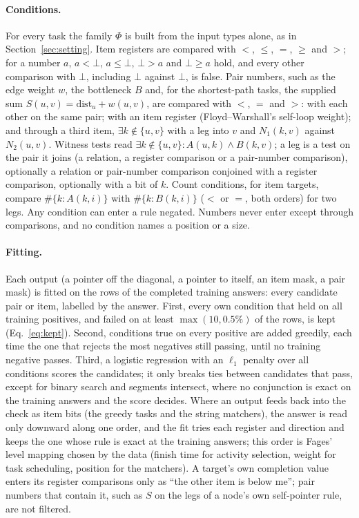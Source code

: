 \documentclass[10pt]{article}
\newcommand{\notyet}{\bot}
\begin{document}
\paragraph{Conditions.} For every task the family $\Phi$ is built from the input types alone, as in
Section~\ref{sec:setting}. Item registers are compared with $<$, $\leq$, $=$, $\geq$ and $>$; for a number $a$, $a<\notyet$,
$a\leq\notyet$, $\notyet>a$ and $\notyet\geq a$ hold, and every other comparison with $\notyet$, including $\notyet$
against $\notyet$, is false. Pair numbers, such as the edge weight $w$, the bottleneck $B$ and, for the shortest-path
tasks, the supplied sum $S(u,v) = \mathrm{dist}_u + w(u,v)$, are compared with $<$, $=$ and $>$: with each other on the
same pair; with an item register (Floyd--Warshall's self-loop weight); and through a third item, $\exists
k\notin\{u,v\}$ with a leg into $v$ and $N_1(k,v)$ against $N_2(u,v)$. Witness tests read $\exists k\notin\{u,v\}:
A(u,k)\wedge B(k,v)$; a leg is a test on the pair it joins (a relation, a register comparison or a pair-number
comparison), optionally a relation or pair-number comparison conjoined with a register comparison, optionally with a bit
of $k$. Count conditions, for item targets, compare $\#\{k : A(k,i)\}$ with $\#\{k : B(k,i)\}$ ($<$ or $=$, both orders)
for two legs. Any condition can enter a rule negated. Numbers never enter except through comparisons, and no condition
names a position or a size.

\paragraph{Fitting.} Each output (a pointer off the diagonal, a pointer to itself, an item mask, a pair mask) is fitted
on the rows of the completed training answers: every candidate pair or item, labelled by the answer. First, every own
condition that held on all training positives, and failed on at least $\max(10, 0.5\%)$ of the rows, is kept
(Eq.~\ref{eq:kept}). Second, conditions true on every positive are added greedily, each time the one that rejects the
most negatives still passing, until no training negative passes\cite{haussler1988quantifying}. Third, a logistic
regression with an $\ell_1$ penalty over all conditions scores the candidates; it only breaks ties between candidates
that pass, except for binary search and segments intersect, where no conjunction is exact on the training answers and
the score decides. Where an output feeds back into the check as item bits (the greedy tasks and the string matchers),
the answer is read only downward along one order, and the fit tries each register and direction and keeps the one
whose rule is exact at the training answers; this order is Fages' level mapping chosen by the data (finish time for
activity selection, weight for task scheduling, position for the matchers). A target's own completion value enters its register comparisons only as ``the other
item is below me''; pair numbers that contain it, such as $S$ on the legs of a node's own self-pointer rule, are not
filtered.
\end{document}
